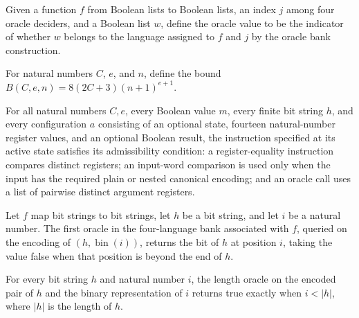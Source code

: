 \begin{definition}
\label{Complexity.compOracle}
\leanok
{}
Given a function $f$ from Boolean lists to Boolean lists, an index $j$ among four oracle
deciders, and a Boolean list $w$, define the oracle value to be the indicator of whether
$w$ belongs to the language assigned to $f$ and $j$ by the oracle bank construction.
\end{definition}

\begin{definition}
\label{Complexity.compBound}
\leanok
For natural numbers $C$, $e$, and $n$, define the bound $B(C,e,n)=8(2C+3)(n+1)^{e+1}$.
\end{definition}

\begin{lemma}
\label{Complexity.comp_preS}
\leanok
{}
For all natural numbers $C,e$, every Boolean value $m$, every finite bit string $h$, and
every configuration $a$ consisting of an optional state, fourteen natural-number
register values, and an optional Boolean result, the instruction specified at its active
state satisfies its admissibility condition: a register-equality instruction compares
distinct registers; an input-word comparison is used only when the input has the
required plain or nested canonical encoding; and an oracle call uses a list of pairwise
distinct argument registers.
\end{lemma}

\begin{lemma}
\label{Complexity.comp_bit}
\leanok
{}
Let $f$ map bit strings to bit strings, let $h$ be a bit string, and let $i$ be a
natural number. The first oracle in the four-language bank associated with $f$, queried
on the encoding of $(h,\operatorname{bin}(i))$, returns the bit of $h$ at position $i$,
taking the value false when that position is beyond the end of $h$.
\end{lemma}

\begin{lemma}
\label{Complexity.comp_len}
\leanok
{}
For every bit string $h$ and natural number $i$, the length oracle on the encoded pair
of $h$ and the binary representation of $i$ returns true exactly when $i<|h|$, where
$|h|$ is the length of $h$.
\end{lemma}

